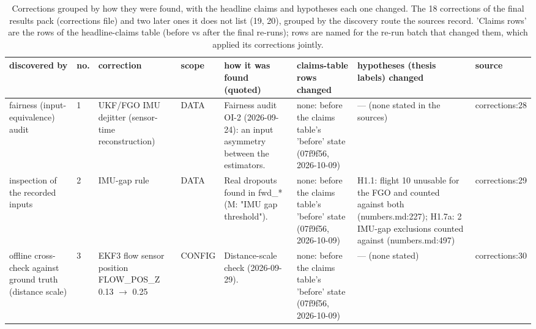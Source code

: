 \begin{table}[htbp]
\centering
\scriptsize
\caption{Corrections grouped by how they were found, with the headline claims and hypotheses each one changed. The 18 corrections of the final results pack (corrections file) and two later ones it does not list (19, 20), grouped by the discovery route the sources record. 'Claims rows' are the rows of the headline-claims table (before vs after the final re-runs); rows are named for the re-run batch that changed them, which applied its corrections jointly.}
\label{tab:R2_corrections_by_discovery}
\begin{tabular}{p{}p{}p{}p{}p{}p{}p{}p{}}
\toprule
\textbf{discovered by} & \textbf{no.} & \textbf{correction} & \textbf{scope} & \textbf{how it was found (quoted)} & \textbf{claims-table rows changed} & \textbf{hypotheses (thesis labels) changed} & \textbf{source} \\
\midrule
fairness (input-equivalence) audit & 1 & UKF/FGO IMU dejitter (sensor-time reconstruction) & DATA & Fairness audit OI-2 (2026-09-24): an input asymmetry between the estimators. & none: before the claims table's 'before' state (07f9f56, 2026-10-09) & --- (none stated in the sources) & corrections:28 \\
inspection of the recorded inputs & 2 & IMU-gap rule & DATA & Real dropouts found in fwd\_* (M: "IMU gap threshold"). & none: before the claims table's 'before' state (07f9f56, 2026-10-09) & H1.1: flight 10 unusable for the FGO and counted against both (numbers.md:227); H1.7a: 2 IMU-gap exclusions counted against (numbers.md:497) & corrections:29 \\
offline cross-check against ground truth (distance scale) & 3 & EKF3 flow sensor position FLOW\_POS\_Z 0.13 $\rightarrow$ 0.25 & CONFIG & Distance-scale check (2026-09-29). & none: before the claims table's 'before' state (07f9f56, 2026-10-09) & --- (none stated) & corrections:30 \\

\end{tabular}
\end{table}
